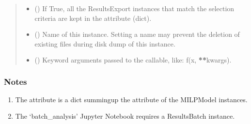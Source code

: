 \documentclass[letterpaper,10pt,english]{sphinxmanual}
\begin{document}
\begin{fulllineitems}
\begin{fulllineitems}
\begin{quote}
\begin{description}
\begin{itemize}
\item {} 
\sphinxAtStartPar
{} (\sphinxstyleliteralemphasis{\sphinxupquote{, }}\sphinxstyleliteralemphasis{\sphinxupquote{, }}) \textendash{} If True, all the ResultsExport instances that match the selection criteria are kept in the  attribute (dict).

\item {} 
\sphinxAtStartPar
{} (\sphinxstyleliteralemphasis{\sphinxupquote{, }}) \textendash{} Name of this instance.
Setting a name may prevent the deletion of existing files during disk dump of this instance.

\item {} 
\sphinxAtStartPar
{} () \textendash{} Keyword arguments passed to the  callable, like: f(x, {\color{red}\bfseries{}**}kwargs).

\end{itemize}

\sphinxAtStartPar
{}

\sphinxAtStartPar
{\hyperref[\detokenize{generated/tamos.data_IO.ResultsBatch:tamos.data_IO.ResultsBatch}]{}}

\end{description}\end{quote}
\subsubsection*{Notes}
\begin{enumerate}
%
\item {} 
\sphinxAtStartPar
The  attribute is a dict summing\sphinxhyphen{}up the  attribute of the MILPModel instances.

\item {} 
\sphinxAtStartPar
The ‘batch\_analysis’ Jupyter Notebook requires a ResultsBatch instance.


\end{enumerate}
\end{fulllineitems}
\end{fulllineitems}
\end{document}

